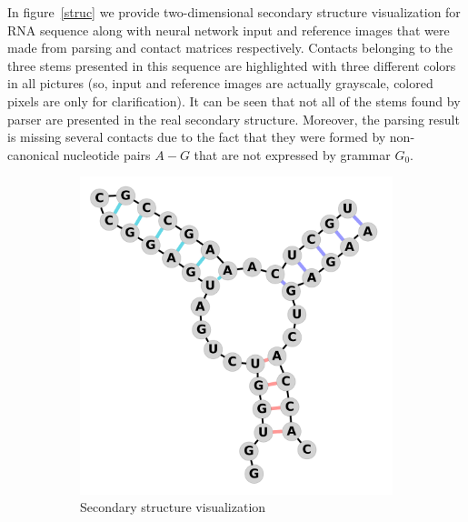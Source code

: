 \documentclass[runningheads]{llncs}
\begin{document}
In figure~\ref{struc} we provide two-dimensional secondary structure visualization for RNA sequence along with neural network input and reference images that were made from parsing and contact matrices respectively. Contacts belonging to the three stems presented in this sequence are highlighted with three different colors in all pictures (so, input and reference images are actually grayscale, colored pixels are only for clarification). It can be seen that not all of the stems found by parser are presented in the real secondary structure. Moreover, the parsing result is missing several contacts due to the fact that they were formed by non-canonical nucleotide pairs $A-G$ that are not expressed by grammar $G_0$.

\captionsetup[subfigure]{justification=centering}
\begin{figure}[h]
\centering
\begin{subfigure}{.33\textwidth}
  \centering
  \hbox{\includegraphics[width=\linewidth]{pics/struct.pdf}}
  \caption{Secondary structure visualization}
  \label{struc_a}
\end{subfigure}%
\begin{subfigure}{.33\textwidth}
  \centering

\end{subfigure}
\end{figure}
\end{document}
